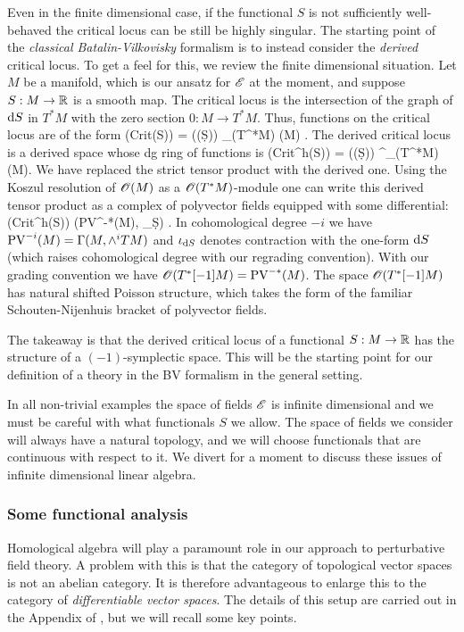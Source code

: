 \documentclass[10pt]{amsart}
\begin{document}
Even in the finite dimensional case, if the functional $S$ is not sufficiently well-behaved the critical locus can be still be highly singular. 
The starting point of the {\em classical Batalin-Vilkovisky} formalism is to instead consider the {\em derived} critical locus.
To get a feel for this, we review the finite dimensional situation.
Let $M$ be a manifold, which is our ansatz for $\mathscr E$ at the moment, and suppose $S : M \to \mathbb R$ is a smooth map.
The critical locus is the intersection of the graph of ${\rm d} S$ in $T^*M$ with the zero section $0 : M \to T^*M$.
Thus, functions on the critical locus are of the form
\ben
\sO({\rm Crit}(S)) = \sO(\Gamma(\d S)) \tensor_{\sO(T^*M)} \sO(M) .
\een
The derived critical locus is a derived space whose dg ring of functions is 
\ben
\sO({\rm Crit}^{h}(S)) = \sO(\Gamma(\d S)) \tensor^{\LL}_{\sO(T^*M)} \sO(M).
\een
We have replaced the strict tensor product with the derived one.
Using the Koszul resolution of $\mathscr O(M)$ as a $\mathscr O(T^*M)$-module one can write this derived tensor product as a complex of polyvector fields equipped with some differential:
\ben
\sO({\rm Crit}^h(S)) \simeq \left({\rm PV}^{-*}(M), \iota_{\d S}\right) .
\een
In cohomological degree $-i$ we have ${\rm PV}^{-i} (M) = \Gamma(M, \wedge^i TM)$ and $\iota_{{\rm d} S}$ denotes contraction with the one-form ${\rm d} S$ (which raises cohomological degree with our regrading convention).
With our grading convention we have $\mathscr O(T^*[-1] M) = {\rm PV}^{-*}(M)$. 
The space $\mathscr O(T^*[-1]M)$ has natural shifted Poisson structure, which takes the form of the familiar Schouten-Nijenhuis bracket of polyvector fields.

The takeaway is that the derived critical locus of a functional $S : M \to \mathbb R$ has the structure of a $(-1)$-symplectic space.
This will be the starting point for our definition of a theory in the BV formalism in the general setting.
 
In all non-trivial examples the space of fields $\mathscr E$ is infinite dimensional and we must be careful with what functionals $S$ we allow.
The space of fields we consider will always have a natural topology, and we will choose functionals that are continuous with respect to it. 
We divert for a moment to discuss these issues of infinite dimensional linear algebra.

\subsubsection{Some functional analysis}
Homological algebra will play a paramount role in our approach to perturbative field theory.
A problem with this is that the category of topological vector spaces is not an abelian category.
It is therefore advantageous to enlarge this to the category of {\em differentiable vector spaces}.
The details of this setup are carried out in the Appendix of \cite{CG1}, but we will recall some key points.
\end{document}

